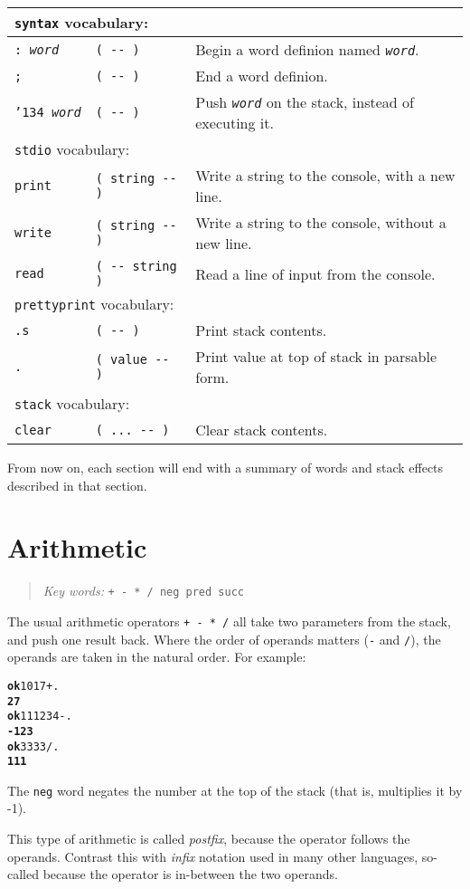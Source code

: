 \documentclass[english]{book}
\newcommand{\ttbackslash}{\char'134}
\newcommand{\chapkeywords}[1]{%
\begin{quote}
\emph{Key words:} \texttt{#1}
\end{quote}
}
\newcommand{\wordtable}[1]{{
\begin{tabularx}{12cm}{|l l X|}
#1
\hline
\end{tabularx}}}
\newcommand{\tabvocab}[1]{
\hline
\multicolumn{3}{|l|}{
\rule[-2mm]{0mm}{6mm}
\texttt{#1} vocabulary:}
\\
\hline
}
\begin{document}
\wordtable{
\tabvocab{syntax}
\texttt{:~\emph{word}}&
\texttt{( -{}- )}&
Begin a word definion named \texttt{\emph{word}}.\\
\texttt{;}&
\texttt{( -{}- )}&
End a word definion.\\
\texttt{\ttbackslash\ \emph{word}}&
\texttt{( -{}- )}&
Push \texttt{\emph{word}} on the stack, instead of executing it.\\
\tabvocab{stdio}
\texttt{print}&
\texttt{( string -{}- )}&
Write a string to the console, with a new line.\\
\texttt{write}&
\texttt{( string -{}- )}&
Write a string to the console, without a new line.\\
\texttt{read}&
\texttt{( -{}- string )}&
Read a line of input from the console.\\
\tabvocab{prettyprint}
\texttt{.s}&
\texttt{( -{}- )}&
Print stack contents.\\
\texttt{.}&
\texttt{( value -{}- )}&
Print value at top of stack in parsable form.\\
\tabvocab{stack}
\texttt{clear}&
\texttt{( ...~-{}- )}&
Clear stack contents.\\
}

From now on, each section will end with a summary of words and stack effects described in that section.

\section{Arithmetic}

\chapkeywords{+ - {*} / neg pred succ}
\index{\texttt{+}}
\index{\texttt{-}}
\index{\texttt{*}}
\index{\texttt{/}}

The usual arithmetic operators \texttt{+ - {*} /} all take two parameters
from the stack, and push one result back. Where the order of operands
matters (\texttt{-} and \texttt{/}), the operands are taken in the natural order. For example:

\begin{alltt}
\textbf{ok} 10 17 + .
\textbf{27}
\textbf{ok} 111 234 - .
\textbf{-123}
\textbf{ok} 333 3 / .
\textbf{111}
\end{alltt}

The \texttt{neg} word negates the number at the top of the stack (that is, multiplies it by -1). 

This type of arithmetic is called \emph{postfix}, because the operator
follows the operands. Contrast this with \emph{infix} notation used
in many other languages, so-called because the operator is in-between
the two operands.
\end{document}
